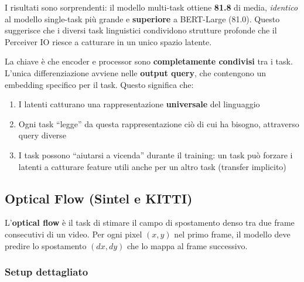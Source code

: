 \documentclass[12pt,a4paper]{article}
\begin{document}
I risultati sono sorprendenti: il modello multi-task ottiene \textbf{81.8} di media, \emph{identico} al modello single-task pi\`u grande e \textbf{superiore} a BERT-Large (81.0). Questo suggerisce che i diversi task linguistici condividono strutture profonde che il Perceiver IO riesce a catturare in un unico spazio latente.

\begin{notabox}
La chiave \`e che encoder e processor sono \textbf{completamente condivisi} tra i task. L'unica differenziazione avviene nelle \textbf{output query}, che contengono un embedding specifico per il task. Questo significa che:
\begin{enumerate}
    \item I latenti catturano una rappresentazione \textbf{universale} del linguaggio
    \item Ogni task ``legge'' da questa rappresentazione ci\`o di cui ha bisogno, attraverso query diverse
    \item I task possono ``aiutarsi a vicenda'' durante il training: un task pu\`o forzare i latenti a catturare feature utili anche per un altro task (transfer implicito)
\end{enumerate}
\end{notabox}


\subsection{Optical Flow (Sintel e KITTI)}

L'\textbf{optical flow} \`e il task di stimare il campo di spostamento denso tra due frame consecutivi di un video. Per ogni pixel $(x, y)$ nel primo frame, il modello deve predire lo spostamento $(dx, dy)$ che lo mappa al frame successivo.

\subsubsection{Setup dettagliato}
\end{document}

